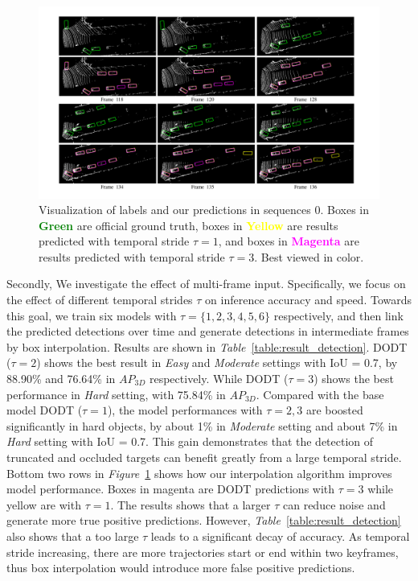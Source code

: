 \documentclass[a4paper, 10pt, conference]{ieeeconf}      %
\def\figurename{\emph{Figure}}
\def\tablename{\emph{Table}}
\begin{document}
\begin{figure}\centering
	\vspace{-0.6cm}
	\rule{0pt}{1ex}
	\begin{center}
		\includegraphics[trim={2cm, 1cm, 2cm, 1cm}, clip, width=\textwidth]{images/examples.pdf}
	\end{center}
	\caption{Visualization of labels and our predictions in sequences 0. Boxes in \textcolor{green}{\textbf{Green}} are official ground truth, boxes in \textcolor{yellow}{\textbf{Yellow}} are results predicted with temporal stride $\tau = 1$, and boxes in \textcolor{magenta}{\textbf{Magenta}} are results predicted with temporal stride $\tau = 3$. Best viewed in color.}
	\setlength{\belowcaptionskip}{-0.2cm}
	\label{fig:examples}
	\vspace{-0.4cm}
\end{figure}

Secondly, We investigate the effect of multi-frame input. Specifically, we focus on the effect of different temporal strides $\tau$  on inference accuracy and speed. Towards this goal, we train six models with $\tau = \{1, 2, 3, 4, 5, 6\}$ respectively, and then link the predicted detections over time and generate detections in intermediate frames by box interpolation. Results are shown in \tablename \, \ref{table:result_detection}. DODT ($\tau = 2$) shows the best result in \textit{Easy} and \textit{Moderate} settings with IoU = 0.7, by 88.90\% and 76.64\% in $AP_{3D}$ respectively. While DODT ($\tau = 3$) shows the best performance in \textit{Hard} setting, with 75.84\% in $AP_{3D}$. Compared with the base model DODT ($\tau = 1$), the model performances with $\tau = 2, 3$ are boosted significantly in hard objects, by about 1\% in \textit{Moderate} setting and about 7\% in \textit{Hard} setting with IoU = 0.7.  This gain demonstrates that the detection of truncated and occluded targets can benefit greatly from a large temporal stride. Bottom two rows in \figurename \, \ref{fig:examples} shows how our interpolation algorithm improves model performance. Boxes in magenta are DODT predictions with $\tau = 3$ while yellow are with $\tau = 1$. The results shows that a larger $\tau$ can reduce noise and generate more true positive predictions. However,  \tablename \, \ref{table:result_detection} also shows that a too large $\tau$ leads to a significant decay of accuracy. As temporal stride increasing, there are more trajectories start or end within two keyframes, thus box interpolation would introduce more false positive predictions. 
\end{document}

